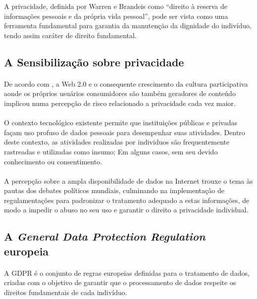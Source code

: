 A privacidade, definida por Warren e Brandeis como ``direito à reserva de informações pessoais e da própria vida pessoal''\cite{warren1890right}, pode ser vista como uma ferramenta fundamental para garantia da manutenção da dignidade do indivíduo, tendo assim caráter de direito fundamental.

\subsection{A Sensibilização sobre privacidade}

\paragraph{} De acordo com \cite{lgpd-evandro}, a Web 2.0 e o consequente crescimento da cultura participativa
aonde os próprios usuários consumidores são também geradores de conteúdo implicou numa percepção de risco relacionado a privacidade cada vez maior.

\paragraph{} O contexto tecnológico existente permite  que instituições públicas e privadas façam uso profuso de dados pessoais para desempenhar suas atividades. Dentro deste contexto, as atividades realizadas por individuos são frequentemente rastreadas e utilizadas como insumo; Em alguns casos, sem seu devido conhecimento ou consentimento.

\paragraph{} A percepção sobre a ampla disponibilidade de dados na Internet trouxe o tema às pautas dos debates políticos 
mundiais, culminando na implementação de regulamentações para padronizar o tratamento adequado
a estas informações, de modo a impedir o abuso no seu uso e garantir o direito a privacidade individual.


\subsection{A \textit{General Data Protection Regulation} europeia}

\paragraph{} A GDPR é o conjunto de regras europeias definidas para o tratamento de dados, criadas com o objetivo de garantir que o processamento de dados respeite os direitos fundamentais de cada indivíduo.

